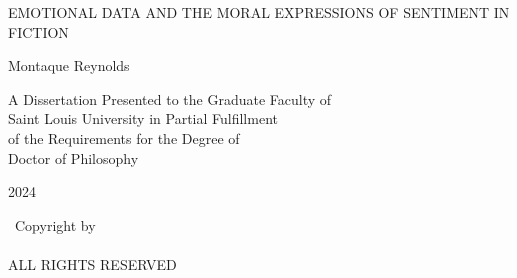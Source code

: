 \documentclass[phdthesis,12pt,final]{wuthesis}
\theoremstyle{definition}
\theoremstyle{definition}
\theoremstyle{definition}
\theoremstyle{definition}
\theoremstyle{remark}
\begin{document}
\begin{titlepage}
\begin{center}
\vspace*{0.5in} %

{\large\MakeUppercase{Emotional Data and The Moral Expressions of Sentiment in Fiction}\par}

\vspace{1in} %

{\large Montaque Reynolds\par}

\vspace{2in} %

A Dissertation Presented to the Graduate Faculty of\\
Saint Louis University in Partial Fulfillment\\
of the Requirements for the Degree of\\
Doctor of Philosophy

\vfill %

2024

\end{center}
\end{titlepage}

\setcounter{page}{2}

\cleardoublepage
\thispagestyle{empty}
\begin{thesiscopyrightpage}
    \vspace*{\fill}
    \begin{center}
    \textcopyright\ Copyright by\\
    \thesisauthor\\
    ALL RIGHTS RESERVED\\
    \thesisyear
    \end{center}
    \vspace*{-10cm} %
\end{thesiscopyrightpage}

\cleardoublepage
\begin{thesiscommittee}
\end{thesiscommittee}


\end{document}
